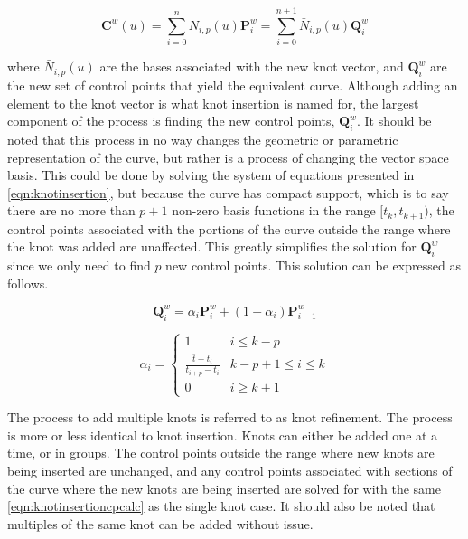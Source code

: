 \begin{equation}
\label{eqn:knotinsertion}
	\mathbf{C}^w(u) = \sum^{n}_{i=0} N_{i,p}(u) \mathbf{P}_i^w = \sum^{n+1}_{i=0} \bar{N}_{i,p}(u) \mathbf{Q}_i^w
\end{equation}

where \(\bar{N}_{i,p}(u)\) are the bases associated with the new knot vector, and \(\mathbf{Q}_i^w\) are the new set of control points that yield the equivalent curve. Although adding an element to the knot vector is what knot insertion is named for, the largest component of the process is finding the new control points, \(\mathbf{Q}_i^w\). It should be noted that this process in no way changes the geometric or parametric representation of the curve, but rather is a process of changing the vector space basis. This could be done by solving the system of equations presented in \cref{eqn:knotinsertion}, but because the curve has compact support, which is to say there are no more than \(p+1\) non-zero basis functions in the range \([t_{k},t_{k+1})\), the control points associated with the portions of the curve outside the range where the knot was added are unaffected. This greatly simplifies the solution for \(\mathbf{Q}_i^w\) since we only need to find $p$ new control points. This solution can be expressed as follows.

\begin{equation}
\label{eqn:knotinsertioncpcalc}
	\mathbf{Q}_i^w = \alpha_i \mathbf{P}_i^w + (1-\alpha_i)\mathbf{P}_{i-1}^w
\end{equation}

\[
\alpha_i = 
\begin{cases}
1 & i\leq k-p\\
\frac{\bar{t}-t_i}{t_{i+p} - t_i} & k-p+1 \leq i \leq k\\
0 & i \geq k+1
\end{cases}
\]


The process to add multiple knots is referred to as knot refinement.  The process is more or less identical to knot insertion. Knots can either be added one at a time, or in groups. The control points outside the range where new knots are being inserted are unchanged, and any control points associated with sections of the curve where the new knots are being inserted are solved for with the same \cref{eqn:knotinsertioncpcalc} as the single knot case. It should also be noted that multiples of the same knot can be added without issue.


